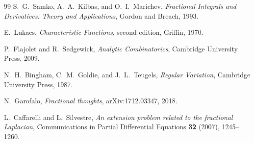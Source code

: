 \documentclass[11pt,oneside]{article}
\theoremstyle{definition}
\theoremstyle{remark}
\newcommand{\1}{\mathbf 1}
\begin{document}
\begin{thebibliography}{99}
S.~G.~Samko, A.~A.~Kilbas, and O.~I.~Marichev,
\emph{Fractional Integrals and Derivatives: Theory and Applications},
Gordon and Breach, 1993.

E.~Lukacs,
\emph{Characteristic Functions}, second edition,
Griffin, 1970.

P.~Flajolet and R.~Sedgewick,
\emph{Analytic Combinatorics},
Cambridge University Press, 2009.


N.~H.~Bingham, C.~M.~Goldie, and J.~L.~Teugels,
\emph{Regular Variation},
Cambridge University Press, 1987.

N.~Garofalo,
\emph{Fractional thoughts},
arXiv:1712.03347, 2018.

L.~Caffarelli and L.~Silvestre,
\emph{An extension problem related to the fractional Laplacian},
Communications in Partial Differential Equations \textbf{32} (2007), 1245--1260.

\end{thebibliography}


\newcommand{\sincPartvvv}{\operatorname{sinc}}
\newcommand{\Log}{\operatorname{Log}}
\newcommand{\RLPartvvv}{\mathrm{RL}}
\newcommand{\Caputo}{\mathrm C}
\newcommand{\repoPartvvv}{\texttt{ProveIt}}
\newcommand{\pathcode}[1]{\texttt{\detokenize{#1}}}
\newcommand{\pochPartvvv}[2]{\left(#1\right)_{#2}}
\newcommand{\LapF}{\mathcal L_F}
\newcommand{\Kord}{\mathcal K}
\newcommand{\Sord}{\mathcal S}
\newtheorem{conditionaltheorem}[theorem]{Conditional theorem}
\newenvironment{proofidea}{\par\smallskip\noindent\textit{Proof architecture.}\ }{\hfill$\square$\par\smallskip}
\newenvironment{boxedresult}{%
  \par\smallskip\noindent\begin{center}\begin{minipage}{0.94\textwidth}%
  \hrule\vspace{0.65em}\small
}{%
  \vspace{0.65em}\hrule\end{minipage}\end{center}\smallskip
}
\end{document}

